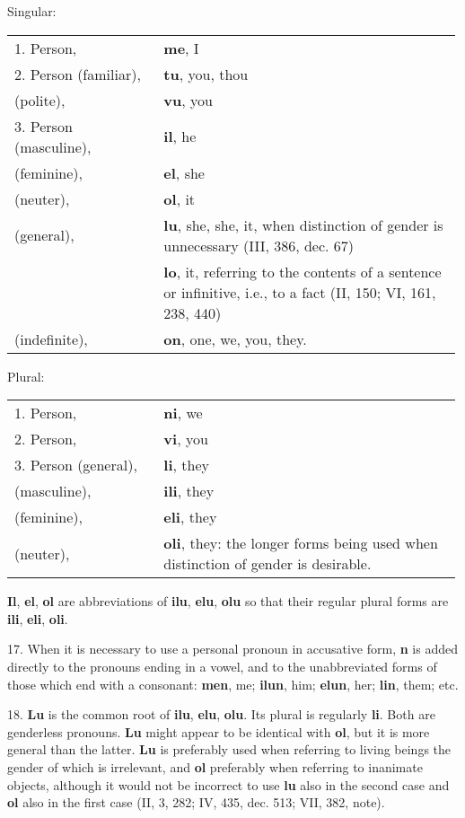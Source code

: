 \Centering Singular:  \\ \justifying 
\begin{tabular}{p{0.33\linewidth} p{0.66\linewidth}}
1. Person, & \textbf{me}, I \\
2. Person (familiar), & \textbf{tu}, you, thou \\
\phantom{2. Person} (polite), & \textbf{vu}, you \\
3. Person (masculine), & \textbf{il}, he \\
\phantom{3. Person} (feminine), & \textbf{el}, she \\
\phantom{3. Person} (neuter), & \textbf{ol}, it \\
\phantom{3. Person} (general), & \textbf{lu}, she, she, it, when distinction of gender is unnecessary (III, 386, dec. 67) \\
& \textbf{lo}, it, referring to the contents of a sentence or infinitive, i.e., to a fact (II, 150; VI, 161, 238, 440) \\
\phantom{3. Person} (indefinite), & \textbf{on}, one, we, you, they.
\end{tabular}
\begin{center}Plural:\end{center} \vspace{-1em}
\begin{tabular}{p{0.33\linewidth} p{0.66\linewidth}}
1. Person, & \textbf{ni}, we \\
2. Person, & \textbf{vi}, you \\
3. Person (general), & \textbf{li}, they \\
\phantom{3. Person} (masculine), & \textbf{ili}, they \\
\phantom{3. Person} (feminine), & \textbf{eli}, they \\
\phantom{3. Person} (neuter), & \textbf{oli}, they: the longer forms being used when distinction of gender is desirable.
\end{tabular}
\textbf{Il}, \textbf{el}, \textbf{ol} are abbreviations of \textbf{ilu}, \textbf{elu}, \textbf{olu} so that their regular plural forms are \textbf{ili}, \textbf{eli}, \textbf{oli}.

17. When it is necessary to use a personal pronoun in accusative form, \textbf{n} is added directly to the pronouns ending in a vowel, and to the unabbreviated forms of those which end with a consonant: \textbf{men}, me; \textbf{ilun}, him; \textbf{elun}, her; \textbf{lin}, them; etc.

18. \textbf{Lu} is the common root of \textbf{ilu}, \textbf{elu}, \textbf{olu}. Its plural is regularly \textbf{li}. Both are genderless pronouns. \textbf{Lu} might appear to be identical with \textbf{ol}, but it is more general than the latter. \textbf{Lu} is preferably used when referring to living beings the gender of which is irrelevant, and \textbf{ol} preferably when referring to inanimate objects, although it would not be incorrect to use \textbf{lu} also in the second case and \textbf{ol} also in the first case (II, 3, 282; IV, 435, dec. 513; VII, 382, note). 

